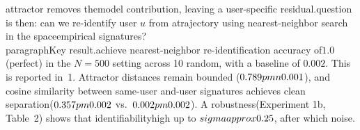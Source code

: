 \documentclass[11pt]{article}
\begin{document}
attractor removes the\nshared model contribution, leaving a user-specific residual.\nThe question is then: can we re-identify user $u$ from a\ntest trajectory using nearest-neighbor search in the space\nof empirical signatures?\n\n\\paragraph{Key result.}\nWe achieve nearest-neighbor re-identification accuracy of\n$1.0$ (perfect) in the $N=500$ setting across 10 random\nseeds, with a baseline of $0.002$. This is reported in\nTable~1. Attractor distances remain bounded ($0.789\\pm\\n0.001$), and cosine similarity between same-user and\ndifferent-user signatures achieves clean separation\n($0.357\\pm 0.002$ vs.~$0.002\\pm 0.002$). A robustness\nsweep (Experiment 1b, Table~2) shows that identifiability\nremains high up to $\\sigma \\approx 0.25$, after which noise\ndominates.\n\n%
\end{document}
